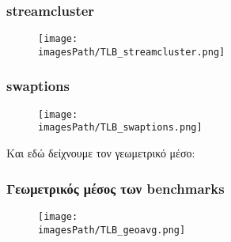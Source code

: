 \documentclass[12pt,a4paper]{article}
\newcommand{\imagesPath}{parsec-3.0/parsec_workspace/graphs}
\begin{document}
			\subsubsection{streamcluster}
				\begin{figure}[H]
					\begin{center}
						\texttt{[image: \\imagesPath/TLB\_streamcluster.png]}
					\end{center}
				\end{figure}
						
			\subsubsection{swaptions}
				\begin{figure}[H]
					\begin{center}
						\texttt{[image: \\imagesPath/TLB\_swaptions.png]}
					\end{center}
				\end{figure}
						
			Και εδώ δείχνουμε τον γεωμετρικό μέσο:
			
			\subsubsection{Γεωμετρικός μέσος των benchmarks}
				\begin{figure}[H]
					\begin{center}
						\texttt{[image: \\imagesPath/TLB\_geoavg.png]}
					\end{center}
				\end{figure}
						
\end{document}
